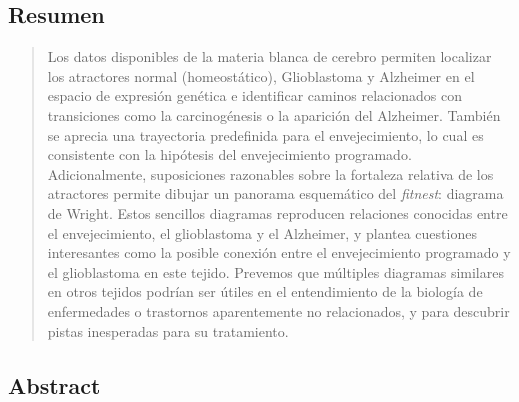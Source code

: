 \vfill

\begin{center}
\section*{Resumen}
\end{center}
\medskip

\begin{minipage}[c]{.9\linewidth}
\begin{quote}
	
{\large Los datos disponibles de la materia blanca de cerebro permiten localizar los atractores normal (homeostático), Glioblastoma y Alzheimer en el espacio de expresión genética e identificar caminos relacionados con transiciones como la carcinogénesis o la aparición del Alzheimer. También se aprecia una trayectoria predefinida para el envejecimiento, lo cual es consistente con la hipótesis del envejecimiento programado. Adicionalmente, suposiciones razonables sobre la fortaleza relativa de los atractores permite dibujar un panorama esquemático del \textit{fitnest}: diagrama de Wright. Estos sencillos diagramas reproducen relaciones conocidas entre el envejecimiento, el glioblastoma y el Alzheimer, y plantea cuestiones interesantes como la posible conexión entre el envejecimiento programado y el glioblastoma en este tejido. Prevemos que múltiples diagramas similares en otros tejidos podrían ser útiles en el entendimiento de la biología de enfermedades o trastornos aparentemente no relacionados, y para descubrir pistas inesperadas para su tratamiento.}




\end{quote}
\end{minipage}

\smallskip
\vfill
\cleardoublepage

\begin{center}
\section*{Abstract}
\end{center}
\medskip

